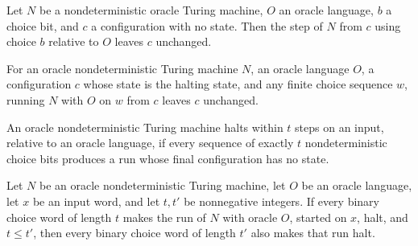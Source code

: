 \begin{lemma}
\label{Turing.OracleNDTM.stepWith_of_halt}
\leanok
{}
Let $N$ be a nondeterministic oracle Turing machine, $O$ an oracle language, $b$ a
choice bit, and $c$ a configuration with no state. Then the step of $N$ from $c$ using
choice $b$ relative to $O$ leaves $c$ unchanged.
\end{lemma}

\begin{lemma}
\label{Turing.OracleNDTM.runWith_of_halt}
\leanok
{}
For an oracle nondeterministic Turing machine $N$, an oracle language $O$, a
configuration $c$ whose state is the halting state, and any finite choice sequence $w$,
running $N$ with $O$ on $w$ from $c$ leaves $c$ unchanged.
\end{lemma}

\begin{definition}
\label{Turing.OracleNDTM.HaltsWithin}
\leanok
{}
An oracle nondeterministic Turing machine halts within $t$ steps on an input, relative
to an oracle language, if every sequence of exactly $t$ nondeterministic choice bits
produces a run whose final configuration has no state.
\end{definition}

\begin{theorem}
\label{Turing.OracleNDTM.HaltsWithin.mono}
\leanok
{}
Let $N$ be an oracle nondeterministic Turing machine, let $O$ be an oracle language, let
$x$ be an input word, and let $t,t'$ be nonnegative integers. If every binary choice
word of length $t$ makes the run of $N$ with oracle $O$, started on $x$, halt, and $t\le
t'$, then every binary choice word of length $t'$ also makes that run halt.
\end{theorem}

